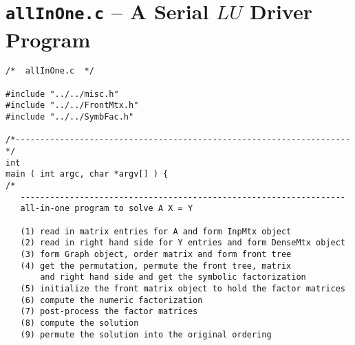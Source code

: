 \vfill \eject
\section{{\tt allInOne.c} -- A Serial $LU$ Driver Program}
\label{section:LU-serial-driver}

\begin{verbatim}
/*  allInOne.c  */

#include "../../misc.h"
#include "../../FrontMtx.h"
#include "../../SymbFac.h"

/*--------------------------------------------------------------------*/
int
main ( int argc, char *argv[] ) {
/*
   ------------------------------------------------------------------
   all-in-one program to solve A X = Y

   (1) read in matrix entries for A and form InpMtx object
   (2) read in right hand side for Y entries and form DenseMtx object
   (3) form Graph object, order matrix and form front tree
   (4) get the permutation, permute the front tree, matrix 
       and right hand side and get the symbolic factorization
   (5) initialize the front matrix object to hold the factor matrices
   (6) compute the numeric factorization
   (7) post-process the factor matrices
   (8) compute the solution
   (9) permute the solution into the original ordering


\end{verbatim}
